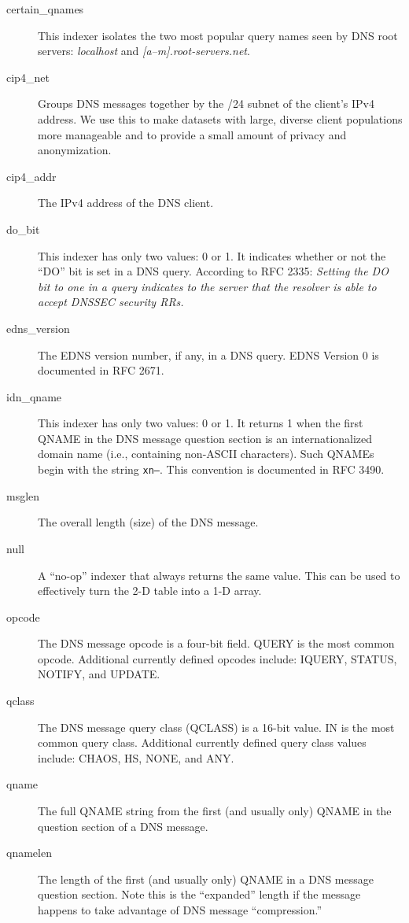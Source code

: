 \documentclass{report}
\begin{document}
\begin{description}
\item[certain\_qnames]
	This indexer isolates the two most popular query names seen
	by DNS root servers: {\em localhost\/} and {\em
	[a--m].root-servers.net\/}.
\item[cip4\_net]
	Groups DNS messages together by the /24 subnet of the
	client's IPv4 address.  We use this to make datasets with
	large, diverse client populations more manageable and to
	provide a small amount of privacy and anonymization.
\item[cip4\_addr]
	The IPv4 address of the DNS client.
\item[do\_bit]
	This indexer has only two values: 0 or 1.  It indicates
	whether or not the ``DO'' bit is set in a DNS query.  According to
	RFC 2335: {\em Setting the DO bit to one in a query indicates
	to the server that the resolver is able to accept DNSSEC
	security RRs.}
\item[edns\_version]
	The EDNS version number, if any, in a DNS query.  EDNS
	Version 0 is documented in RFC 2671.
\item[idn\_qname]
	This indexer has only two values: 0 or 1.  It returns 1
	when the first QNAME in the DNS message question section
	is an internationalized domain name (i.e., containing
	non-ASCII characters).  Such QNAMEs begin with the string
	{\tt xn--\/}.  This convention is documented in RFC 3490.
\item[msglen]
	The overall length (size) of the DNS message.
\item[null]
	A ``no-op'' indexer that always returns the same value.
	This can be used to effectively turn the 2-D table into a
	1-D array.
\item[opcode]
	The DNS message opcode is a four-bit field.  QUERY is the
	most common opcode.  Additional currently defined opcodes
	include: IQUERY, STATUS, NOTIFY, and UPDATE.
\item[qclass]
	The DNS message query class (QCLASS) is a 16-bit value.  IN
	is the most common query class.  Additional currently defined
	query class values include: CHAOS, HS, NONE, and ANY.
\item[qname]
	The full QNAME string from the first (and usually only)
	QNAME in the question section of a DNS message.
\item[qnamelen]
	The length of the first (and usually only) QNAME in a DNS
	message question section.  Note this is the ``expanded''
	length if the message happens to take advantage of DNS
	message ``compression.''

\end{description}
\end{document}
